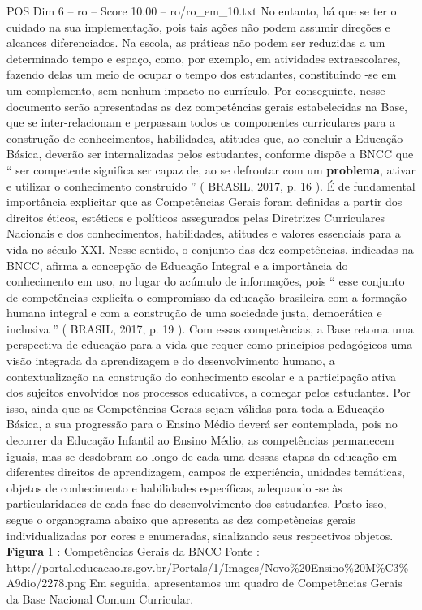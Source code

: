 \begin{textsample}{POS Dim 6 – ro – Score 10.00 – ro/ro\_em\_10.txt}
No entanto, há que se ter o cuidado na sua implementação, pois tais ações não podem assumir direções e alcances diferenciados.
Na escola, as práticas não podem ser reduzidas a um determinado tempo e espaço, como, por exemplo, em atividades extraescolares, fazendo delas um meio de ocupar o tempo dos estudantes, constituindo -se em um complemento, sem nenhum impacto no currículo.
Por conseguinte, nesse documento serão apresentadas as dez competências gerais estabelecidas na Base, que se inter-relacionam e perpassam todos os componentes curriculares para a construção de conhecimentos, habilidades, atitudes que, ao concluir a Educação Básica, deverão ser internalizadas pelos estudantes, conforme dispõe a BNCC que “ ser competente significa ser capaz de, ao se defrontar com um \textbf{problema}, ativar e utilizar o conhecimento construído ” ( BRASIL, 2017, p. 16 ).
É de fundamental importância explicitar que as Competências Gerais foram definidas a partir dos direitos éticos, estéticos e políticos assegurados pelas Diretrizes Curriculares Nacionais e dos conhecimentos, habilidades, atitudes e valores essenciais para a vida no século XXI.
Nesse sentido, o conjunto das dez competências, indicadas na BNCC, afirma a concepção de Educação Integral e a importância do conhecimento em uso, no lugar do acúmulo de informações, pois “ esse conjunto de competências explicita o compromisso da educação brasileira com a formação humana integral e com a construção de uma sociedade justa, democrática e inclusiva ” ( BRASIL, 2017, p. 19 ).
Com essas competências, a Base retoma uma perspectiva de educação para a vida que requer como princípios pedagógicos uma visão integrada da aprendizagem e do desenvolvimento humano, a contextualização na construção do conhecimento escolar e a participação ativa dos sujeitos envolvidos nos processos educativos, a começar pelos estudantes.
Por isso, ainda que as Competências Gerais sejam válidas para toda a Educação Básica, a sua progressão para o Ensino Médio deverá ser contemplada, pois no decorrer da Educação Infantil ao Ensino Médio, as competências permanecem iguais, mas se desdobram ao longo de cada uma dessas etapas da educação em diferentes direitos de aprendizagem, campos de experiência, unidades temáticas, objetos de conhecimento e habilidades específicas, adequando -se às particularidades de cada fase do desenvolvimento dos estudantes.
Posto isso, segue o organograma abaixo que apresenta as dez competências gerais individualizadas por cores e enumeradas, sinalizando seus respectivos objetos. \textbf{Figura} 1 : Competências Gerais da BNCC Fonte : http://portal.educacao.rs.gov.br/Portals/1/Images/Novo\%20Ensino\%20M\%C3\%A9dio/2278.png Em seguida, apresentamos um quadro de Competências Gerais da Base Nacional Comum Curricular.

\end{textsample}
